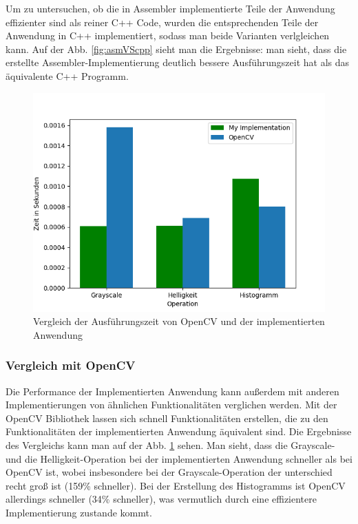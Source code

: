 \documentclass[11pt]{amsart}
\begin{document}
Um zu untersuchen, ob die in Assembler implementierte Teile der Anwendung effizienter sind als reiner C++ Code, wurden die entsprechenden Teile der Anwendung in C++ implementiert, sodass man beide Varianten verlgleichen kann. Auf der Abb. \ref{fig:asmVScpp} sieht man die Ergebnisse: man sieht, dass die erstellte Assembler-Implementierung deutlich bessere Ausführungszeit hat als das äquivalente C++ Programm.



 

 \begin{figure}
\includegraphics[scale=0.65]{images/openCVvsMy.png}
\caption{Vergleich der Ausführungszeit von OpenCV und der implementierten Anwendung}
\label{fig:opencvVSmy}
\end{figure}

\subsubsection{Vergleich mit OpenCV}


Die Performance der Implementierten Anwendung kann außerdem mit anderen Implementierungen von ähnlichen Funktionalitäten verglichen werden. Mit der OpenCV Bibliothek lassen sich schnell Funktionalitäten erstellen, die zu den Funktionalitäten der implementierten Anwendung äquivalent sind. Die Ergebnisse des Vergleichs kann man auf der Abb. \ref{fig:opencvVSmy} sehen. Man sieht, dass die Grayscale- und die Helligkeit-Operation bei der implementierten Anwendung schneller als bei OpenCV ist, wobei insbesondere bei der Grayscale-Operation der unterschied recht groß ist (159\% schneller). Bei der Erstellung des Histogramms ist OpenCV allerdings schneller (34\% schneller), was vermutlich durch eine effizientere Implementierung zustande kommt.
\end{document}
